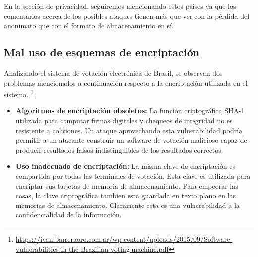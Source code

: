 En la sección de privacidad, seguiremos mencionando estos países ya que los comentarios acerca de los posibles ataques tienen más que ver con la pérdida del anonimato que con el formato de almacenamiento en sí.

\subsection{Mal uso de esquemas de encriptación}
Analizando el sistema de votación electrónica de Brasil, se observan dos problemas mencionados a continuación respecto a la encriptación utilizada en el sistema.
\footnote{\url{https://ivan.barreraoro.com.ar/wp-content/uploads/2015/09/Software-vulnerabilities-in-the-Brazilian-voting-machine.pdf}}
\begin{itemize}
	\item \textbf{Algoritmos de encriptación obsoletos:} La función criptográfica SHA-1 utilizada para computar firmas digitales y chequeos de integridad no es resistente a colisiones. Un ataque aprovechando esta vulnerabilidad podría permitir a un atacante construir un software de votación malicioso capaz de producir resultados falsos indistinguibles de los resultados correctos.
	\item \textbf{Uso inadecuado de encriptación: } La misma clave de encriptación es compartida por todas las terminales de votación. Esta clave es utilizada para encriptar sus tarjetas de memoria de almacenamiento. Para empeorar las cosas, la clave criptográfica tambien esta guardada en texto plano en las memorias de almacenamiento. Claramente esta es una vulnerabilidad a la confidencialidad de la información.
\end{itemize}










